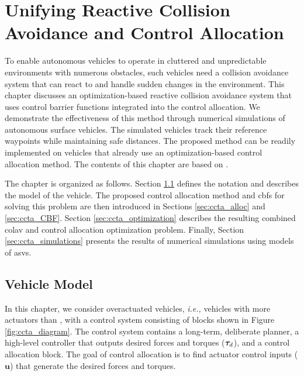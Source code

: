 \chapter{Unifying Reactive Collision Avoidance and Control Allocation}
\label{chap:collision_avoidance}

To enable autonomous vehicles to operate in cluttered and unpredictable environments with numerous obstacles, such vehicles need a collision avoidance system that can react to and handle sudden changes in the environment.
This chapter discusses an optimization-based reactive collision avoidance system that uses control barrier functions integrated into the control allocation.
We demonstrate the effectiveness of this method through numerical simulations of autonomous surface vehicles. The simulated vehicles track their reference waypoints while maintaining safe distances.
The proposed method can be readily implemented on vehicles that already use an optimization-based control allocation method.
The contents of this chapter are based on \cite{matous_unifying_2021}.

The chapter is organized as follows.
Section \ref{sec:ccta_model} defines the notation and describes the model of the vehicle.
The proposed control allocation method and \glspl{cbf} for solving this problem are then introduced in Sections \ref{sec:ccta_alloc} and \ref{sec:ccta_CBF}.
Section \ref{sec:ccta_optimization} describes the resulting combined \gls{colav} and control allocation optimization problem.
Finally, Section \ref{sec:ccta_simulations} presents the results of numerical simulations using models of \glspl{asv}.

\section{Vehicle Model}
\label{sec:ccta_model}

In this chapter, we consider overactuated vehicles, \emph{i.e.,} vehicles with more actuators than , with a control system consisting of blocks shown in Figure \ref{fig:ccta_diagram}.
The control system contains a long-term, deliberate planner, a high-level controller that outputs desired forces and torques ($\bm{\tau}_d$), and a control allocation block.
The goal of control allocation is to find actuator control inputs ($\mathbf{u}$) that generate the desired forces and torques.

